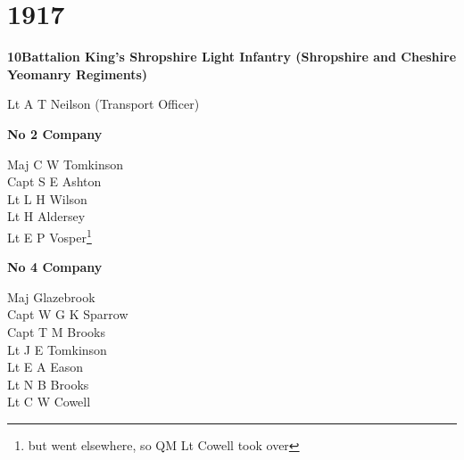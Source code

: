 \chapter*{1917}

\vspace*{10mm}

\begin{center}
  \Large
  \textbf{10\nth Battalion King's Shropshire Light Infantry (Shropshire and Cheshire \\ Yeomanry Regiments)}
\end{center}

\begin{multicols}{2}
  \noindent
  Lt A T Neilson (Transport Officer) \\
\end{multicols}

\vspace*{10mm}

\begin{center}
  \Large
  \textbf{No 2 Company}
\end{center}

\begin{multicols}{2}
  \noindent
  Maj C W Tomkinson \\
  Capt S E Ashton \\
  Lt L H Wilson \\
  Lt H Aldersey \\
  Lt E P Vosper\footnote{but went elsewhere, so QM Lt Cowell took over} \\
\end{multicols}

\vspace*{10mm}

\begin{center}
  \Large
  \textbf{No 4 Company}
\end{center}

\begin{multicols}{2}
  \noindent
  Maj Glazebrook \\
  Capt W G K Sparrow \\
  Capt T M Brooks \\
  Lt J E Tomkinson \\
  Lt E A Eason \\
  Lt N B Brooks \\
  Lt C W Cowell \\
\end{multicols}

